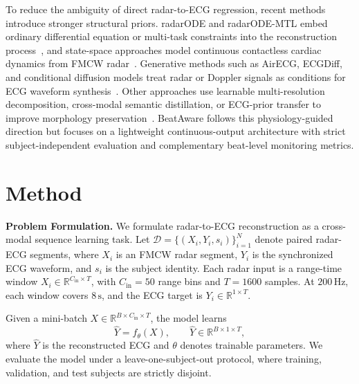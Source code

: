 \documentclass[runningheads]{llncs}
\begin{document}
To reduce the ambiguity of direct radar-to-ECG regression, recent methods introduce stronger structural priors. radarODE and radarODE-MTL embed ordinary differential equation or multi-task constraints into the reconstruction process~\cite{radarode,radarodemt}, and state-space approaches model continuous contactless cardiac dynamics from FMCW radar~\cite{11322590}. Generative methods such as AirECG, ECGDiff, and conditional diffusion models treat radar or Doppler signals as conditions for ECG waveform synthesis~\cite{airecg,ecgdiff,FromRadarCardiography}. Other approaches use learnable multi-resolution decomposition, cross-modal semantic distillation, or ECG-prior transfer to improve morphology preservation~\cite{lifwavnet,radar2ecg,cross-modalautoencoder}. BeatAware follows this physiology-guided direction but focuses on a lightweight continuous-output architecture with strict subject-independent evaluation and complementary beat-level monitoring metrics.

\section{Method}

\noindent\textbf{Problem Formulation.}
We formulate radar-to-ECG reconstruction as a cross-modal sequence learning task. Let $\mathcal{D}=\{(X_i,Y_i,s_i)\}_{i=1}^{N}$ denote paired radar-ECG segments, where $X_i$ is an FMCW radar segment, $Y_i$ is the synchronized ECG waveform, and $s_i$ is the subject identity. Each radar input is a range-time window $X_i\in\mathbb{R}^{C_{\mathrm{in}}\times T}$, with $C_{\mathrm{in}}=50$ range bins and $T=1600$ samples. At $200\,\mathrm{Hz}$, each window covers $8\,\mathrm{s}$, and the ECG target is $Y_i\in\mathbb{R}^{1\times T}$.

Given a mini-batch $X\in\mathbb{R}^{B\times C_{\mathrm{in}}\times T}$, the model learns
\begin{equation}
    \hat{Y}=f_{\theta}(X), \qquad 
    \hat{Y}\in\mathbb{R}^{B\times 1\times T},
\end{equation}
where $\hat{Y}$ is the reconstructed ECG and $\theta$ denotes trainable parameters. We evaluate the model under a leave-one-subject-out protocol, where training, validation, and test subjects are strictly disjoint.
\end{document}
